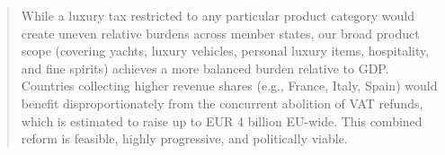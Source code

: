 \documentclass{article}
\begin{document}
\begin{abstract}
While a luxury tax restricted to any particular product category would create uneven relative burdens across member states, our broad product scope (covering yachts, luxury vehicles, personal luxury items, hospitality, and fine spirits) achieves a more balanced burden relative to GDP. Countries collecting higher revenue shares (e.g., France, Italy, Spain) would benefit disproportionately from the concurrent abolition of VAT refunds, which is estimated to raise up to EUR 4 billion EU-wide. This combined reform is feasible, highly progressive, and politically viable.
\end{abstract}
\end{document}
